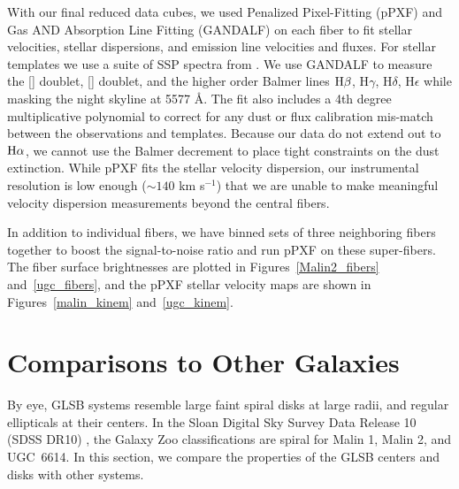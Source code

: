 \documentclass{emulateapj}
\def\arcsec{$^{\prime\prime}$}
\newcommand\kms{km s$^{-1}$}
\newcommand\ha{$\rm{H}\alpha$}
\newcommand\hb{$\rm{H}\beta$}
\begin{document}
With our final reduced data cubes, we used Penalized Pixel-Fitting (pPXF) \citep{Cappellari04} and Gas AND Absorption Line Fitting (GANDALF) \citep{Sarzi06} on each fiber to fit stellar velocities, stellar dispersions, and emission line velocities and fluxes.  For stellar templates we use a suite of SSP spectra from \citet{Bruzual03}.  We use GANDALF to measure the [] doublet, [] doublet, and the higher order Balmer lines \hb, H$\gamma$, H$\delta$, H$\epsilon$ while masking the night skyline at 5577 \AA.  The fit also includes a 4th degree multiplicative polynomial to correct for any dust or flux calibration mis-match between the observations and templates.  Because our data do not extend out to \ha, we cannot use the Balmer decrement to place tight constraints on the dust extinction.  While pPXF fits the stellar velocity dispersion, our instrumental resolution is low enough ($\sim140$ \kms) that we are unable to make meaningful velocity dispersion measurements beyond the central fibers.  

In addition to individual fibers, we have binned sets of three neighboring fibers together to boost the signal-to-noise ratio and run pPXF on these super-fibers. The fiber surface brightnesses are plotted in Figures~\ref{Malin2_fibers} and~\ref{ugc_fibers}, and the pPXF stellar velocity maps are shown in Figures~\ref{malin_kinem} and~\ref{ugc_kinem}.






\section{Comparisons to Other Galaxies}\label{sec:compare_gals}

By eye, GLSB systems resemble large faint spiral disks at large radii, and regular ellipticals at their centers.  In the Sloan Digital Sky Survey Data Release 10 (SDSS DR10) \citep{Ahn14}, the Galaxy Zoo classifications \citep{Willett13} are spiral for Malin 1, Malin 2, and UGC~6614.  In this section, we compare the properties of the GLSB centers and disks with other systems.  
\end{document}
